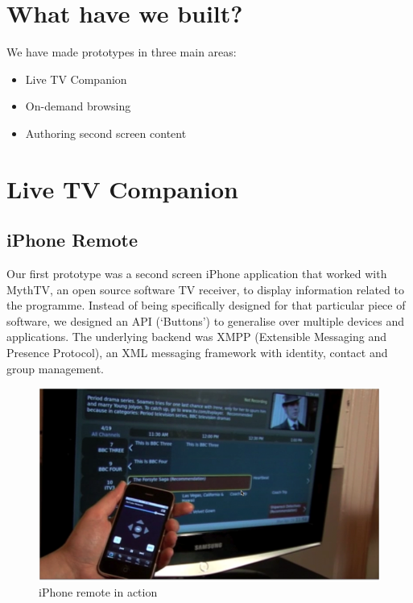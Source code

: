 \documentclass{notube}
\begin{document}
\section{What have we built?}

We have made prototypes in three main areas:

\begin{itemize}
\item{Live TV Companion}
\item{On-demand browsing}
\item{Authoring second screen content}
\end{itemize}

\section{Live TV Companion}

\subsection{iPhone Remote}

Our first prototype was a second screen iPhone application that worked with MythTV, an open source software TV receiver, to display information related to the programme. Instead of being specifically designed for that particular piece of software, we designed an API (`Buttons') to generalise over multiple devices and applications. The underlying backend was XMPP (Extensible Messaging and Presence Protocol), an XML messaging framework with identity, contact and group management. 

\begin{figure}[htbp]
\begin{center}
\includegraphics[width=6in]{images/year1.png}
\caption{iPhone remote in action} \label{fig:year1}
\end{center}
\end{figure} 
\end{document}

